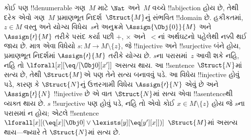 \documentclass[../../../include/open-logic-section]{subfiles}
\begin{document}
\begin{explain}
કોઈ પણ !!{denumerable} ગણ~$M$ માટે $\Nat$ અને~$M$ વચ્ચે
!!a{bijection} હોય છે, તેથી દરેક એવો ગણ~$M$ પ્રમાણભૂત
નિદર્શ~$\Struct{M}$નું સંભવિત !!{domain} છે. હકીકતમાં,
$z\in M$ વસ્તુ અને યોગ્ય વિધેય~$s$ને અનુક્રમે
$\Assign{\Obj{0}}{M}$ અને $\Assign{\prime}{M}$ તરીકે પસંદ કર્યા પછી
$+$, $\times$ અને~$<$નાં અર્થઘટનો પહેલેથી નક્કી થઈ જાય છે. માત્ર એવા
વિધેયો $s\colon M\to M\setminus\{z\}$, જે !!{injective} અને
!!{surjective} બંને હોય, પ્રમાણભૂત નિદર્શમાં $\Assign{\prime}{M}$
તરીકે યોગ્ય છે. $s$ના પરાસમાં~$z$ આવી શકે નહિ, નહિ તો
$\lforall[x][\eq/[\Obj 0][x']]$ અસત્ય થાય. આ !!{sentence}
$\Struct{N}$માં સત્ય છે, તેથી $\Struct{M}$એ પણ તેને સત્ય બનાવવું
પડે. આ વિધેય !!{injective} હોવું પડે, કારણ કે $\Struct{N}$નું
ઉત્તરગામી વિધેય $\Assign{\prime}{N}$ એવું છે અને
$\Assign{\prime}{N}$ !!{injective} છે એ વાત $\Struct{N}$માં સત્ય એવા
!!a{sentence}થી વ્યક્ત થાય છે. $s$ !!{surjective} પણ હોવું પડે, નહિ
તો એવો કોઈ $x\in M\setminus\{z\}$ હોય જે $s$ના પરાસમાં ન હોય; એટલે
!!{sentence} $\lforall[x][(\eq[x][\Obj 0]\lor\lexists[y][\eq[y'][x]])]$
$\Struct{M}$માં અસત્ય થાય—જ્યારે તે $\Struct{N}$માં સત્ય છે.
\end{explain}
\end{document}
